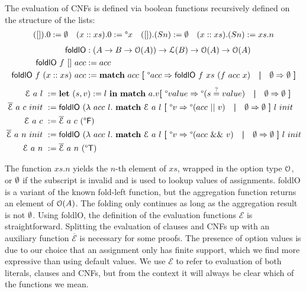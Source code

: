 \documentclass[a4paper,UKenglish,cleveref, autoref]{lipics-v2019}
\begin{document}
The evaluation of CNFs is defined via boolean functions recursively defined on the structure of the lists:
\begin{align*}
  ([]).0 := \emptyset && (x :: xs).0 := \degree x && ([]).(S n) := \emptyset && (x :: xs).(S n) := xs.n
\end{align*}
\vspace{-2em}
\begin{align*}
  \textsf{foldlO} &: (A \rightarrow B \rightarrow \mathcal{O}{(A)}) \rightarrow \mathcal{L} (B) \rightarrow \mathcal{O}{(A)} \rightarrow \mathcal{O}{(A)}\\ 
  \textsf{foldlO}~f~[]~acc &:= acc\\
  \textsf{foldlO}~f~(x::xs)~acc &:= \textbf{match}~ acc~\textbf{[}~ \degree acc \Rightarrow \textsf{foldlO}~f~xs~(f~acc~x) \quad\textbf{|}\quad \emptyset \Rightarrow \emptyset ~\textbf{]}
\end{align*}
\vspace{-2em}
\begin{align*}
  \mathcal{E}~a~l~ &:= \textbf{let}~ (s, v) := l~\textbf{in}~ \textbf{match}~ a.v \textbf{[}~ \degree value \Rightarrow \degree(s\overset{?}{=}value) \quad\textbf{|}\quad \emptyset \Rightarrow \emptyset ~\textbf{]} \\
  \overline{\mathcal{E}}~a~c~init~ &:= \textsf{foldlO}~(\lambda~acc~l.~ \textbf{match}~ \mathcal{E}~a~l~ \textbf{[}~ \degree v \Rightarrow \degree(acc~||~v) \quad\textbf{|}\quad \emptyset \Rightarrow \emptyset~\textbf{]}~l~init \\
  \mathcal{E}~a~c~ &:= \overline{\mathcal{E}}~a~c~(\degree\mathsf{F})~\\
  \overline{\mathcal{E}}~a~n~init~ &:= \textsf{foldlO}~(\lambda~acc~l.~ \textbf{match}~ \mathcal{E}~a~l~ \textbf{[}~\degree v \Rightarrow \degree(acc~\&\&~v) \quad\textbf{|}\quad \emptyset \Rightarrow \emptyset~\textbf{]}~l~init\\
  \mathcal{E}~a~n~ &:=\overline{\mathcal{E}}~a~n~(\degree\mathsf{T})~
\end{align*}

The function $xs.n$ yields the $n$-th element of $xs$, wrapped in the option type $\mathcal{O}{}$, or $\emptyset$ if the subscript is invalid and is used to lookup values of assignments. \textsf{foldlO} is a variant of the known fold-left function, but the aggregation function returns an element of $\mathcal{O}{(A)}$. The folding only continues as long as the aggregation result is not $\emptyset$. 
Using \textsf{foldlO}, the definition of the evaluation functions $\mathcal{E}$ is straightforward. Splitting the evaluation of clauses and CNFs up with an auxiliary function $\overline{\mathcal{E}}$ is necessary for some proofs. The presence of option values is due to our choice that an assignment only has finite support, which we find more expressive than using default values. 
We use $\mathcal{E}$ to refer to evaluation of both literals, clauses and CNFs, but from the context it will always be clear which of the functions we mean.
\end{document}
